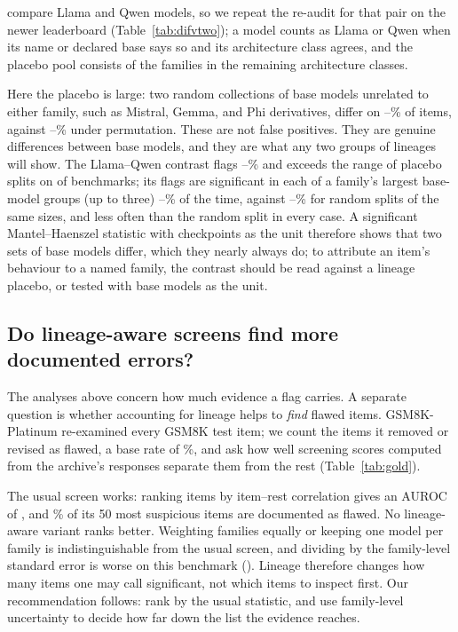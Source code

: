 \documentclass[10pt]{article}
\theoremstyle{remark}\newtheorem{remark}{Remark}
\begin{document}
\citet{dif2026llm} compare Llama and Qwen models, so we repeat the re-audit
for that pair on the newer leaderboard (Table~\ref{tab:difvtwo}); a model
counts as Llama or Qwen when its name or declared base says so and its
architecture class agrees, and the placebo pool consists of the families in
the remaining architecture classes.

Here the placebo is large: two random collections of base models unrelated to
either family, such as Mistral, Gemma, and Phi derivatives, differ on
\VrPlaceboMin--\VrPlaceboMax\% of items, against \VrPermMin--\VrPermMax\%
under permutation. These are not false positives. They are genuine
differences between base models, and they are what any two groups of lineages
will show. The Llama--Qwen contrast flags \VrNamedMin--\VrNamedMax\% and
exceeds the range of placebo splits on \VrAbove{} of \VrTasks{} benchmarks;
its flags are significant in each of a family's largest base-model groups (up
to three) \VrRepMin--\VrRepMax\% of the time, against
\VrRepNullMin--\VrRepNullMax\% for random splits of the same sizes, and less
often than the random split in every case. A
significant Mantel--Haenszel statistic with checkpoints as the unit therefore
shows that two sets of base models differ, which they nearly always do; to
attribute an item's behaviour to a named family, the contrast should be read
against a lineage placebo, or tested with base models as the unit.

\subsection{Do lineage-aware screens find more documented errors?}\label{sec:gold}
The analyses above concern how much evidence a flag carries. A separate
question is whether accounting for lineage helps to \emph{find} flawed items.
GSM8K-Platinum \citep{vendrow2025platinum} re-examined every GSM8K test item;
we count the \GoldGsmFlawed{} items it removed or revised as flawed, a base
rate of \GoldGsmBase\%, and ask how well screening scores computed from the
archive's responses separate them from the rest (Table~\ref{tab:gold}).

The usual screen works: ranking items by item--rest correlation gives an AUROC
of \GoldGsmAuroc, and \GoldGsmTop\% of its 50 most suspicious items are
documented as flawed. No lineage-aware variant ranks better. Weighting
families equally or keeping one model per family is indistinguishable from the
usual screen, and dividing by the family-level standard error is worse on
this benchmark (\GoldGsmFamAuroc). \GoldMmluText
Lineage therefore changes how many items one may call significant, not which
items to inspect first. Our recommendation follows: rank by the usual
statistic, and use family-level uncertainty to decide how far down the list
the evidence reaches.
\end{document}
